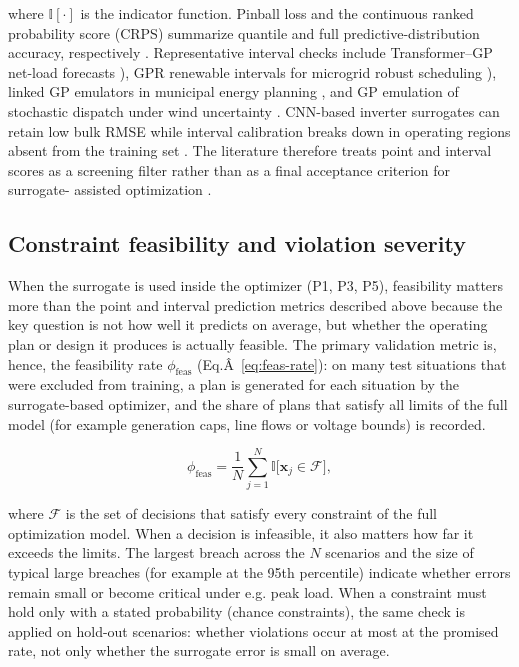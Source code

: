 where $\mathbb{I}[\cdot]$ is the indicator function. Pinball loss and
the continuous ranked probability score (CRPS) summarize quantile and
full predictive-distribution accuracy, respectively
\cite{Hu2024,Sun20191497}. Representative interval checks include
Transformer--GP net-load forecasts \cite{Hu2024}), GPR renewable intervals
for microgrid robust scheduling \cite{Yang2024__2}), linked GP emulators in
municipal energy planning \cite{Volodina2022,Lawson201647}, and GP
emulation of stochastic dispatch under wind uncertainty
\cite{Hu2020,Hu2021671}. CNN-based inverter surrogates can retain low bulk
RMSE while interval calibration breaks down in operating regions absent
from the training set \cite{Subedi2026157}. The literature therefore treats
point and interval scores as a screening filter rather than as a final
acceptance criterion for surrogate- assisted optimization
\cite{Khaloie2025,Lim2025}.

\subsection{Constraint feasibility and violation severity}
\label{sec:val:feasibility}

When the surrogate is used inside the optimizer (P1, P3, P5),
feasibility matters more than the point and interval prediction metrics
described above because the key question is not how well it predicts on
average, but whether the operating plan or design it produces is
actually feasible. The primary validation metric is, hence, the
feasibility rate $\phi_{\mathrm{feas}}$
(Eq.Â~\eqref{eq:feas-rate}): on many test situations that were excluded
from training, a plan is generated for each situation by the
surrogate-based optimizer, and the share of plans that satisfy all
limits of the full model (for example generation caps, line flows or
voltage bounds) is recorded.

$$\begin{equation}
  \phi_{\mathrm{feas}}
    = \frac{1}{N}\sum_{j=1}^{N}
      \mathbb{I}\!\big[\mathbf{x}_j \in \mathcal{F}\big],
  \label{eq:feas-rate}
\end{equation}$$

where $\mathcal{F}$ is the set of decisions that satisfy every
constraint of the full optimization model. When a decision is
infeasible, it also matters how far it exceeds the limits. The largest
breach across the $N$ scenarios and the size of typical large breaches
(for example at the 95th percentile) indicate whether errors remain
small or become critical under e.g. peak load. When a constraint must
hold only with a stated probability (chance constraints), the same check
is applied on hold-out scenarios: whether violations occur at most at
the promised rate, not only whether the surrogate error is small on
average.

